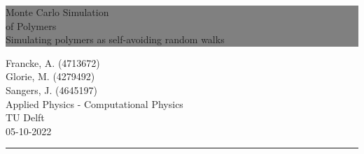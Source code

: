 \begin{titlepage} %
	
	
	\colorbox{grey}{
		\parbox[t]{0.93\textwidth}{ %
			\parbox[t]{0.91\textwidth}{ %
				\raggedleft %
				\fontsize{50pt}{50pt}\selectfont %
				\vspace{0.7cm} %
				Monte Carlo Simulation\\
				of Polymers\\
				
				\fontsize{15pt}{30pt}\selectfont
				Simulating polymers as self-avoiding random walks
				\vspace{0.7cm} %
			}
		}
	}
	
	\vfill %
	
	
	\parbox[t]{0.93\textwidth}{ %
		\raggedleft %
		\large %
		{\Large Francke, A. (4713672)\\ Glorie, M. (4279492)\\ Sangers, J. (4645197)}\\[4pt] %
		Applied Physics - Computational Physics\\
		TU Delft\\
		05-10-2022\\[4pt]
		\hfill\rule{0.4\linewidth}{1pt}%
	}
	
\end{titlepage}